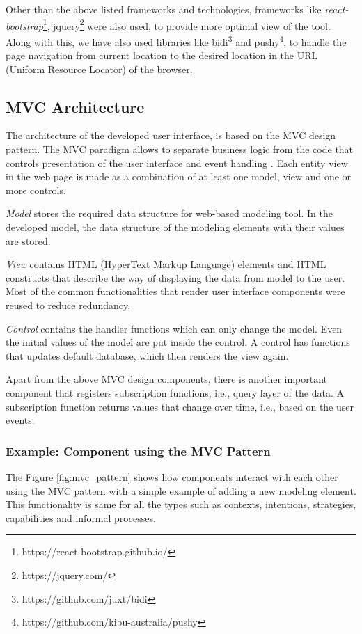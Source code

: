 Other than the above listed frameworks and technologies, frameworks like \textit{react-bootstrap}\footnote{https://react-bootstrap.github.io/}, jquery\footnote{https://jquery.com/} were also used, to provide more optimal view of the tool. Along with this, we have also used libraries like bidi\footnote{https://github.com/juxt/bidi} and pushy\footnote{https://github.com/kibu-australia/pushy}, to handle the page navigation from current location to the desired location in the URL (Uniform Resource Locator) of the browser. 

\subsection{MVC Architecture}
\label{subsec:mvcarch}
The architecture of the developed user interface, is based on the MVC design pattern. The MVC paradigm allows to separate business logic from the code that controls presentation of the user interface and event handling \cite{Oracle2016}. Each entity view in the web page is made as a combination of at least one model, view and one or more controls. 

\textit{Model} stores the required data structure for web-based modeling tool. In the developed model, the data structure of the modeling elements with their values are stored. 

\textit{View} contains HTML (HyperText Markup Language) elements and HTML constructs that describe the way of displaying the data from model to the user. Most of the common functionalities that render user interface components were reused to reduce redundancy. 

\textit{Control} contains the handler functions which can only change the model. Even the initial values of the model are put inside the control. A control has functions that updates default database, which then renders the view again. 

Apart from the above MVC design components, there is another important component that registers subscription functions, i.e., query layer of the data. A subscription function returns values that change over time, i.e., based on the user events.

\subsubsection{Example: Component using the MVC Pattern }
The Figure \ref{fig:mvc_pattern} shows how components interact with each other using the MVC pattern with a simple example of adding a new modeling element. This functionality is same for all the types such as contexts, intentions, strategies, capabilities and informal processes.  

